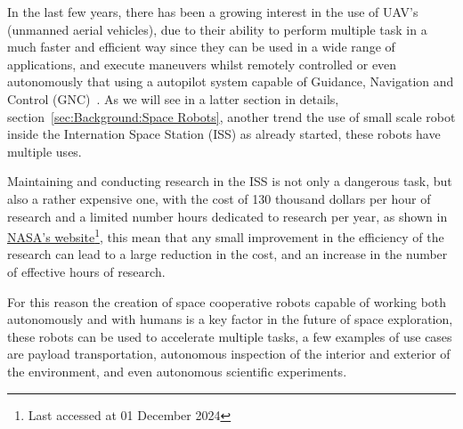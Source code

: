 \par In the last few years, there has been a growing interest in the use of UAV's (unmanned aerial vehicles), due to their ability to perform multiple task in a much faster and efficient way since they can be used in a wide range of applications, and execute maneuvers whilst remotely controlled or even autonomously that using a autopilot system capable of Guidance, Navigation and Control (GNC)~\cite{chao2010autopilots}. As we will see in a latter section in details, section~\ref{sec:Background:Space Robots}, another trend the use of small scale robot inside the Internation Space Station (ISS) as already started, these robots have multiple uses.


Maintaining and conducting research in the ISS is not only a dangerous task, but also a rather expensive one, with the cost of 130 thousand dollars per hour of research and a limited number hours dedicated to research per year, as shown in  \href{https://www.nasa.gov/humans-in-space/commercial-and-marketing-pricing-policy/}{NASA's website}\footnote{Last accessed at 01 December 2024}, this mean that any small improvement in the efficiency of the research can lead to a large reduction in the cost, and an increase in the number of effective hours of research.

For this reason the creation of space cooperative robots capable of working both autonomously and with humans is a key factor in the future of space exploration, these robots can be used to accelerate multiple tasks, a few examples of use cases are payload transportation, autonomous inspection of the interior and exterior of the environment, and even autonomous scientific experiments. 